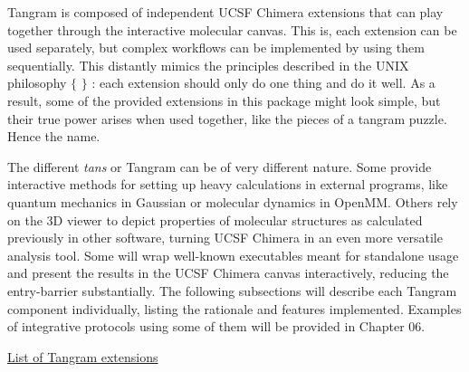Tangram is composed of independent UCSF Chimera extensions that can play together through the interactive molecular canvas. This is, each extension can be used separately, but complex workflows can be implemented by using them sequentially. This distantly mimics the principles described in the UNIX philosophy $ \{ $ $ \} $ : each extension should only do one thing and do it well. As a result, some of the provided extensions in this package might look simple, but their true power arises when used together, like the pieces of a tangram puzzle. Hence the name.

The different \textit{tans} or Tangram can be of very different nature. Some provide interactive methods for setting up heavy calculations in external programs, like quantum mechanics in Gaussian or molecular dynamics in OpenMM. Others rely on the 3D viewer to depict properties of molecular structures as calculated previously in other software, turning UCSF Chimera in an even more versatile analysis tool. Some will wrap well-known executables meant for standalone usage and present the results in the UCSF Chimera canvas interactively, reducing the entry-barrier substantially. The following subsections will describe each Tangram component individually, listing the rationale and features implemented. Examples of integrative protocols using some of them will be provided in Chapter 06.

\uline{List of Tangram extensions}

